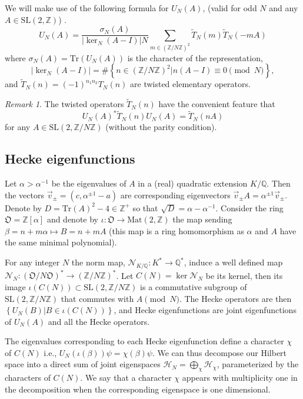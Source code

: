 \documentclass[12pt]{amsart}
\theoremstyle{definition}
\theoremstyle{remark}
\newtheorem{rem}{Remark}[section]
\numberwithin{equation}{section}
\newcommand{\set}[1]{\left\{#1\right\}}
\newcommand{\T}[1]{\tilde{T}_{#1}}
\newcommand{\TT}[1]{T_{#1}}
\newcommand{\frakO}{\mathfrak{O}}
\newcommand{\calN}{\mathcal{N}}
\newcommand{\bbZ}{\mathbb{Z}}
\newcommand{\bbQ}{\mathbb{Q}}
\newcommand{\Tr}{ \mbox{Tr}}
\newcommand{\SL}{ \mathrm{SL}}
\newcommand{\Mat}{\mathrm{Mat}}
\newcommand{\calH}{\mathcal{H}}
\begin{document}
We will make use of the following formula for $U_N(A)$, (valid for
odd $N$ and any $A\in\SL(2,\bbZ)$) \cite[Proposition
1.4]{Kelmer05Arith}.
\begin{equation}\label{e:form}
U_{N}(A)=\frac{\sigma_N(A)}{|\ker_N(A-I)|N}\sum_{m\in (\bbZ/N
\bbZ)^2}\T{N}(m)\T{N}(-mA)
\end{equation}
where $\sigma_N(A)=\Tr(U_N(A))$ is the character of the
representation,
$$|\ker_N(A-I)|=\#\set{n\in(\bbZ/N\bbZ)^2|n(A-I)\equiv 0\pmod{N}},$$
and $\T{N}(n)=(-1)^{n_1n_2}\TT{N}(n)$ are  twisted elementary
operators.
\begin{rem}
The twisted operators $\T{N}(n)$ have the convenient feature that
$$U_N(A)^*\T{N}(n)U_N(A)=\T{N}(nA)$$ for any $A\in\SL(2,\bbZ/N\bbZ)$ (without the parity condition).
\end{rem}

\subsection{Hecke eigenfunctions}
Let $\alpha>\alpha^{-1}$ be the eigenvalues of $A$ in a (real)
quadratic extension $K/\bbQ$. Then the vectors
$\vec{v}_\pm=(c,\alpha^{\pm 1}-a)$ are corresponding eigenvectors
$\vec{v}_\pm A=\alpha^{\pm 1}\vec{v}_{\pm}$. Denote by
$D=\Tr(A)^2-4\in\bbZ^{+}$ so that $\sqrt{D}=\alpha-\alpha^{-1}$.
Consider the ring $\frakO=\bbZ[\alpha]$ and denote by
$\iota:\frakO\to\Mat(2,\bbZ)$ the map sending
$\beta=n+m\alpha\mapsto B=n+mA$ (this map is a ring homomorphism as
$\alpha$ and $A$ have the same minimal polynomial).

For any integer $N$ the norm map, $\calN_{K/\bbQ}:K^*\to\bbQ^*$,
induce a well defined map
$\calN_{N}:(\frakO/N\frakO)^*\to(\bbZ/N\bbZ)^*$. Let $C(N)=\ker
\calN_N$ be its kernel, then its image $\iota(C(N))\subset
\SL(2,\bbZ/N\bbZ)$ is a commutative subgroup of $\SL(2,\bbZ/N\bbZ)$
that commutes with $A \pmod{N}$. The Hecke operators are then
$\set{U_N(B)|B\in\iota(C(N))}$, and Hecke eigenfunctions are joint
eigenfunctions of $U_N(A)$ and all the Hecke operators.

The eigenvalues corresponding to each Hecke eigenfunction define a
character $\chi$ of $C(N)$ i.e.,
$U_N(\iota(\beta))\psi=\chi(\beta)\psi$. We can thus decompose our
Hilbert space into a direct sum of joint eigenspaces
$\calH_N=\bigoplus_{\chi} \calH_\chi$, parameterized by the
characters of $C(N)$. We say that a character $\chi$ appears with
multiplicity one in the decomposition when the corresponding
eigenspace is one dimensional.
\end{document}
